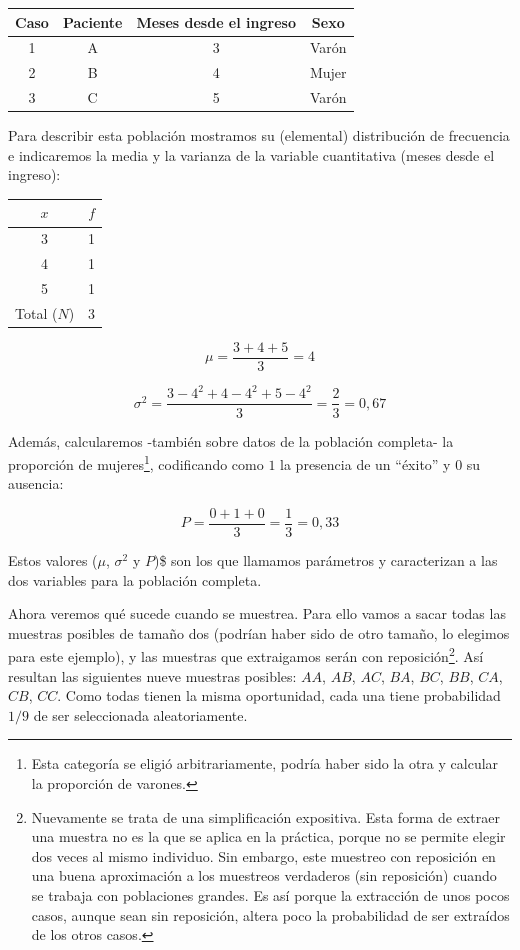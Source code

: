 \documentclass[]{book}
\let\rmarkdownfootnote\footnote%
\def\footnote{\protect\rmarkdownfootnote}
\begin{document}
\begin{table}[H]
\centering
\begin{tabular}{cccc}
\toprule
Caso & Paciente & Meses desde el ingreso & Sexo\\
\midrule
\rowcolor{gray!6}  1 & A & 3 & Varón\\
2 & B & 4 & Mujer\\
\rowcolor{gray!6}  3 & C & 5 & Varón\\
\bottomrule
\end{tabular}
\end{table}

Para describir esta población mostramos su (elemental) distribución de
frecuencia e indicaremos la media y la varianza de la variable
cuantitativa (meses desde el ingreso):

\begin{table}[H]
\centering
\begin{tabular}{cc}
\toprule
$x$ & $f$\\
\midrule
\rowcolor{gray!6}  3 & 1\\
4 & 1\\
\rowcolor{gray!6}  5 & 1\\
Total ($N$) & 3\\
\bottomrule
\end{tabular}
\end{table}

\[\mu = \frac{3 + 4 + 5}{3} = 4\]

\[\sigma^{2} = \frac{3 - 4^{2} + 4 - 4^{2} + 5 - 4^{2}}{3} = \frac{2}{3} = 0,67\]

Además, calcularemos -también sobre datos de la población completa- la
proporción de mujeres\footnote{Esta categoría se eligió arbitrariamente, podría haber sido la otra y calcular la proporción de varones.}, codificando como \(1\) la presencia de un
``éxito'' y \(0\) su ausencia:

\[P = \frac{0 + 1 + 0}{3} = \frac{1}{3} = 0,33\]

Estos valores (\(\mu\), \(\sigma^{2}\) y \(P\))\$ son los que llamamos parámetros y caracterizan a las dos variables para la población completa.

Ahora veremos qué sucede cuando se muestrea. Para ello vamos a sacar
todas las muestras posibles de tamaño dos (podrían haber sido de otro
tamaño, lo elegimos para este ejemplo), y las muestras que extraigamos
serán con reposición\footnote{Nuevamente se trata de una simplificación expositiva. Esta forma de extraer una muestra no es la que se aplica en la práctica, porque no se permite elegir dos veces al mismo individuo. Sin embargo, este muestreo con reposición en una buena aproximación a los muestreos verdaderos (sin reposición) cuando se trabaja con poblaciones grandes. Es así porque la extracción de unos pocos casos, aunque sean sin reposición, altera poco la probabilidad de ser extraídos de los otros casos.}. Así resultan las siguientes nueve muestras posibles: \(AA\), \(AB\), \(AC\), \(BA\), \(BC\), \(BB\), \(CA\), \(CB\), \(CC\). Como todas tienen la misma oportunidad, cada una tiene probabilidad \(1/9\) de ser seleccionada aleatoriamente.
\end{document}
